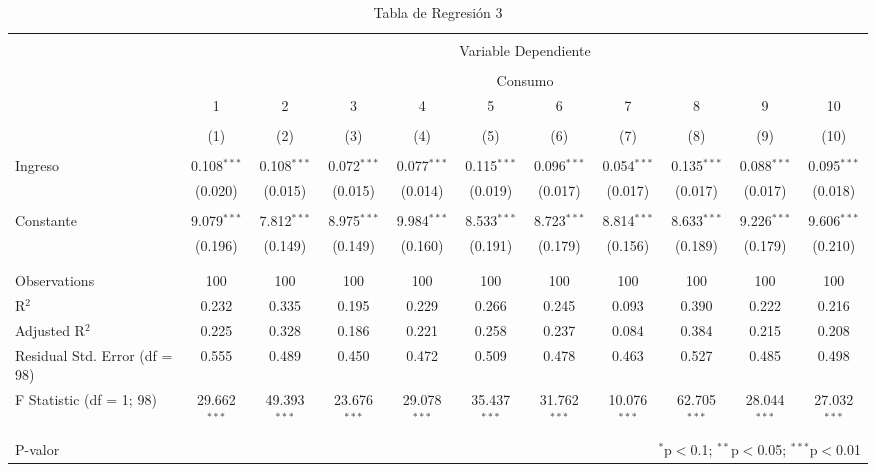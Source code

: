 \documentclass[
]{article}
\begin{document}
\newpage
\begin{landscape}


\begin{table}[!htbp] \centering 
  \caption{Tabla de Regresión 3} 
  \label{} 
\footnotesize 
\begin{tabular}{@{\extracolsep{5pt}}lcccccccccc} 
\\[-1.8ex]\hline 
\hline \\[-1.8ex] 
 & \multicolumn{10}{c}{Variable Dependiente} \\ 
\cline{2-11} 
\\[-1.8ex] & \multicolumn{10}{c}{Consumo} \\ 
 & 1 & 2 & 3 & 4 & 5 & 6 & 7 & 8 & 9 & 10 \\ 
\\[-1.8ex] & (1) & (2) & (3) & (4) & (5) & (6) & (7) & (8) & (9) & (10)\\ 
\hline \\[-1.8ex] 
 Ingreso & 0.108$^{***}$ & 0.108$^{***}$ & 0.072$^{***}$ & 0.077$^{***}$ & 0.115$^{***}$ & 0.096$^{***}$ & 0.054$^{***}$ & 0.135$^{***}$ & 0.088$^{***}$ & 0.095$^{***}$ \\ 
  & (0.020) & (0.015) & (0.015) & (0.014) & (0.019) & (0.017) & (0.017) & (0.017) & (0.017) & (0.018) \\ 
  & & & & & & & & & & \\ 
 Constante & 9.079$^{***}$ & 7.812$^{***}$ & 8.975$^{***}$ & 9.984$^{***}$ & 8.533$^{***}$ & 8.723$^{***}$ & 8.814$^{***}$ & 8.633$^{***}$ & 9.226$^{***}$ & 9.606$^{***}$ \\ 
  & (0.196) & (0.149) & (0.149) & (0.160) & (0.191) & (0.179) & (0.156) & (0.189) & (0.179) & (0.210) \\ 
  & & & & & & & & & & \\ 
\hline \\[-1.8ex] 
Observations & 100 & 100 & 100 & 100 & 100 & 100 & 100 & 100 & 100 & 100 \\ 
R$^{2}$ & 0.232 & 0.335 & 0.195 & 0.229 & 0.266 & 0.245 & 0.093 & 0.390 & 0.222 & 0.216 \\ 
Adjusted R$^{2}$ & 0.225 & 0.328 & 0.186 & 0.221 & 0.258 & 0.237 & 0.084 & 0.384 & 0.215 & 0.208 \\ 
Residual Std. Error (df = 98) & 0.555 & 0.489 & 0.450 & 0.472 & 0.509 & 0.478 & 0.463 & 0.527 & 0.485 & 0.498 \\ 
F Statistic (df = 1; 98) & 29.662$^{***}$ & 49.393$^{***}$ & 23.676$^{***}$ & 29.078$^{***}$ & 35.437$^{***}$ & 31.762$^{***}$ & 10.076$^{***}$ & 62.705$^{***}$ & 28.044$^{***}$ & 27.032$^{***}$ \\ 
\hline 
\hline \\[-1.8ex] 
P-valor & \multicolumn{10}{r}{$^{*}$p$<$0.1; $^{**}$p$<$0.05; $^{***}$p$<$0.01} \\ 
\end{tabular} 
\end{table} 


\end{landscape}
\end{document}
